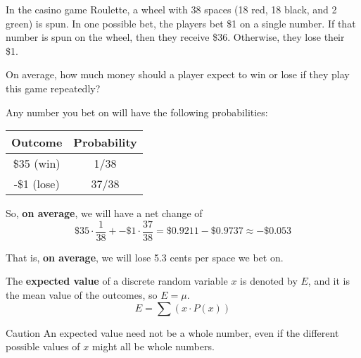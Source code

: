 \documentclass{beamer}
\newcommand{\prob}[1]{P\left(#1\right)}
\begin{document}
\begin{frame}
\begin{example}
In the casino game Roulette, a wheel with 38 spaces (18 red, 18 black, and 2 green) is spun. In one possible bet, the players bet \$1 on a single number. If that number is spun on the wheel, then they receive \$36. Otherwise, they lose their \$1.

\vspace{2mm}
On average, how much money should a player expect to win or lose if they play this game repeatedly?\pause

\vspace{2mm}
Any number you bet on will have the following probabilities:
\begin{center}
\begin{tabular}{|c|c|} \hline
Outcome & Probability \\ \hline
\$35 (win) & 1/38 \\\hline
-\$1 (lose) & 37/38 \\ \hline
\end{tabular}
\end{center}\pause

So, \textbf{on average}, we will have a net change of
\begin{equation*}
\$35\cdot\dfrac{1}{38} + -\$1\cdot\dfrac{37}{38} = \$0.9211 - \$0.9737 \approx -\$0.053
\end{equation*}

That is, \textbf{on average}, we will lose 5.3 cents per space we bet on.
\end{example}
\end{frame}

\begin{frame}
\begin{definition}
The \textbf{expected value} of a discrete random variable $x$ is denoted by $E$, and it is the mean value of the outcomes, so $E=\mu$.
\begin{equation*}
E=\sum\left(x\cdot\prob{x}\right)
\end{equation*}
\end{definition}\pause

\begin{block}{Caution}
An expected value need not be a whole number, even if the different possible values of $x$ might all be whole numbers.
\end{block}
\end{frame}
\end{document}
